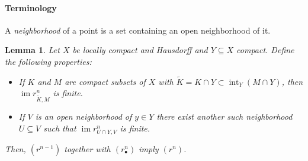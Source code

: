 \documentclass{amsart}
\newtheorem{lemma}[theorem]{Lemma}
\DeclareMathOperator{\im}{im}
\DeclareMathOperator{\interior}{int}
\begin{document}
	
	\paragraph{Terminology} A \textit{neighborhood} of a point is a set containing an open neighborhood of it.
	
	\begin{lemma} \label{l: wilder}
		Let $X$ be locally compact and Hausdorff and $Y \subseteq X$ compact. Define the following properties:
		\begin{itemize}
			\item[$(r^n)$] If $K$ and $M$ are compact subsets of $X$ with $\widetilde K = K \cap Y \subset \interior_Y(M \cap Y)$, then $\im r^n_{\widetilde K, M}$ is finite.
			\item[$(r^n_\bullet)$] If $V$ is an open neighborhood of $y \in Y$ there exist another such neighborhood $U \subseteq V$ such that $\im r^n_{U \cap Y, V}$ is finite.
		\end{itemize}
		Then, $(r^{n-1})$ together with $(r^n_\bullet)$ imply $(r^n)$.
	\end{lemma}
	
\end{document}
